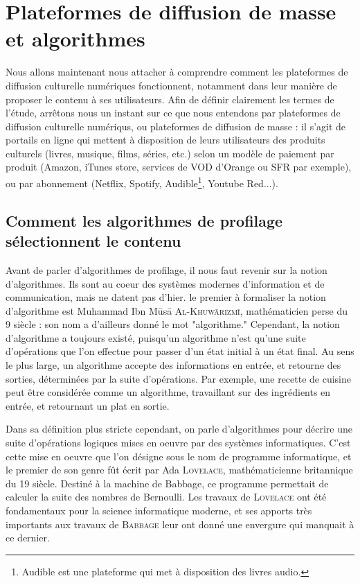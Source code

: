 \documentclass[a4paper,14pt]{extreport}
\begin{document}
\chapter{Plateformes de diffusion de masse et algorithmes}

Nous allons maintenant nous attacher à comprendre comment les plateformes de diffusion culturelle numériques fonctionnent, notamment dans leur manière de proposer le contenu à ses utilisateurs. Afin de définir clairement les termes de l'étude, arrêtons nous un instant sur ce que nous entendons par plateformes de diffusion culturelle numériqus, ou plateformes de diffusion de masse : il s'agit de portails en ligne qui mettent à disposition de leurs utilisateurs des produits culturels (livres, musique, films, séries, etc.) selon un modèle de paiement par produit (Amazon, iTunes store, services de VOD d'Orange ou SFR par exemple), ou par abonnement (Netflix, Spotify, Audible\footnote{Audible est une plateforme qui met à disposition des livres audio.}, Youtube Red...).

\section{Comment les algorithmes de profilage sélectionnent le contenu}

Avant de parler d'algorithmes de profilage, il nous faut revenir sur la notion d'algorithmes. Ils sont au coeur des systèmes modernes d'information et de communication, mais ne datent pas d'hier. le premier à formaliser la notion d'algorithme est Muhammad Ibn Mūsā \textsc{Al-Khuwārizmī}, mathématicien perse du 9 siècle : son nom a d'ailleurs donné le mot "algorithme." Cependant, la notion d'algorithme a toujours existé, puisqu'un algorithme n'est qu'une suite d'opérations que l'on effectue pour passer d'un état initial à un état final. Au sens le plus large, un algorithme accepte des informations en entrée, et retourne des sorties, déterminées par la suite d'opérations. Par exemple, une recette de cuisine peut être considérée comme un algorithme, travaillant sur des ingrédients en entrée, et retournant un plat en sortie. 

Dans sa définition plus stricte cependant, on parle d'algorithmes pour décrire une suite d'opérations logiques mises en oeuvre par des systèmes informatiques. C'est cette mise en oeuvre que l'on désigne sous le nom de programme informatique, et le premier de son genre fût écrit par Ada \textsc{Lovelace}, mathématicienne britannique du 19 siècle. Destiné à la machine de Babbage, ce programme permettait de calculer la suite des nombres de Bernoulli. Les travaux de \textsc{Lovelace} ont été fondamentaux pour la science informatique moderne, et ses apports très importants aux travaux de \textsc{Babbage} leur ont donné une envergure qui manquait à ce dernier.
\end{document}
